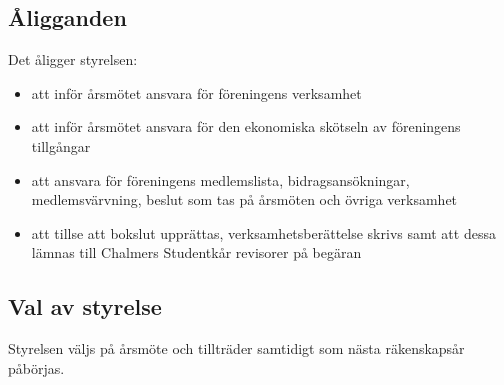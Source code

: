 \subsection{Åligganden}
Det åligger styrelsen:
\begin{itemize}
    \item att inför årsmötet ansvara för föreningens verksamhet
    \item att inför årsmötet ansvara för den ekonomiska skötseln av föreningens tillgångar
    \item att ansvara för föreningens medlemslista, bidragsansökningar, medlemsvärvning, beslut som tas på årsmöten och övriga verksamhet
    \item att tillse att bokslut upprättas, verksamhetsberättelse skrivs samt att dessa lämnas till Chalmers Studentkår revisorer på begäran
\end{itemize}

\subsection{Val av styrelse}
Styrelsen väljs på årsmöte och tillträder samtidigt som nästa räkenskapsår påbörjas.